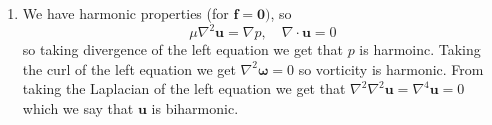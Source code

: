 \documentclass{article}
\begin{document}
\begin{enumerate}
\begin{example}
	\end{example}
	We'll show a similar result with rotation (psuedovectors) instead of velocity.
	\begin{example}
		(Falling uniform rod does not rotate). Suppose a rod falls with angular velocity $ \Omega $ due to the falling motion. Reverse $ g $ so $ \Omega $ now goes the other way and $ g $ points up. Now rotate by $ \pi $ so we have the same problem with $ \Omega $ going the opposite direction, so by symmetry we have that $ \Omega = 0 $, i.e there is no rotation induced by the fall.
	\end{example}
\item We have harmonic properties (for $ \mathbf f = \mathbf 0) $, so
	\[
	  \mu\nabla^2 \mathbf u = \nabla p,\quad \nabla\cdot\mathbf u = 0
	\]
	so taking divergence of the left equation we get that $ p $ is harmoinc. Taking the curl of the left equation we get $ \nabla^2\boldsymbol\omega = 0 $ so vorticity is harmonic. From taking the Laplacian of the left equation we get that $ \nabla^2\nabla^2 \mathbf u = \nabla^4 \mathbf u = 0 $ which we say that $ \mathbf u $ is biharmonic.
\end{enumerate}
\end{document}
